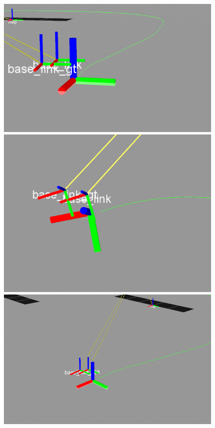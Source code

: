 \begin{figure}[h!]
  \includegraphics[width=\linewidth]{tp4_imagenes/informe_goal_bias_08_rviz1.png}
\endminipage\hfill
{}
  \includegraphics[width=\linewidth]{tp4_imagenes/informe_goal_bias_08_rviz2.png}
\endminipage\hfill
{}%
  \includegraphics[width=\linewidth]{tp4_imagenes/informe_goal_bias_08_rviz3.png}
\endminipage
\end{figure}

